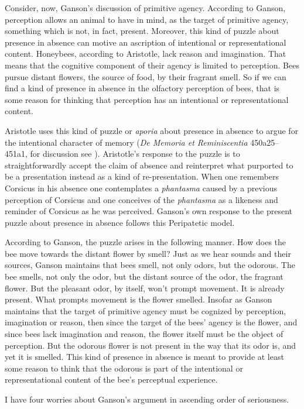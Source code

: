 \documentclass[12pt]{article}
\begin{document}
Consider, now,  Ganson's discussion of primitive agency. According to Ganson, perception allows an animal to have in mind, as the target of primitive agency, something which is not, in fact, present. Moreover, this kind of puzzle about presence in absence can motive an ascription of intentional or representational content. Honeybees, according to Aristotle, lack reason and imagination. That means that the cognitive component of their agency is limited to perception. Bees pursue distant flowers, the source of food, by their fragrant smell. So if we can find a kind of presence in absence in the olfactory perception of bees, that is some reason for thinking that perception has an intentional or representational content. 

Aristotle uses this kind of puzzle or \emph{aporia} about presence in absence to argue for the intentional character of memory (\emph{De Memoria et Reminiscentia} 450a25–451a1, for discussion see \citealt{Sorabji:2004qa}). Aristotle's response to the puzzle is to straightforwardly accept the claim of absence and reinterpret what purported to be a presentation instead as a kind of re-presentation. When one remembers Corsicus in his absence one contemplates a \emph{phantasma} caused by a previous perception of Corsicus and one conceives of the \emph{phantasma} as a likeness and reminder of Corsicus as he was perceived. Ganson's own response to the present puzzle about presence in absence follows this Peripatetic model.

According to Ganson, the puzzle arises in the following manner. How does the bee move towards the distant flower by smell? Just as we hear sounds and their sources, Ganson maintains that bees smell, not only odors, but the odorous. The bee smells, not only the odor, but the distant source of the odor, the fragrant flower. But the pleasant odor, by itself, won't prompt movement. It is already present. What prompts movement is the flower smelled. Insofar as Ganson maintains that the target of primitive agency must be cognized by perception, imagination or reason, then since the target of the bees' agency is the flower, and since bees lack imagination and reason, the flower itself must be the object of perception. But the odorous flower is not present in the way that its odor is, and yet it is smelled. This kind of presence in absence is meant to provide at least some reason to think that the odorous is part of the intentional or representational content of the bee's perceptual experience. 

I have four worries about Ganson's argument in ascending order of seriousness.
\end{document}
